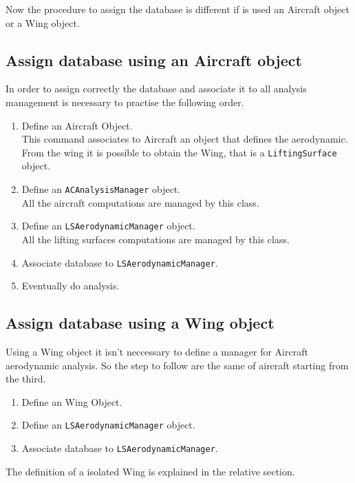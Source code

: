 Now the procedure to assign the database is different if is used an Aircraft object or a Wing object.

\subsection {Assign database using an Aircraft object}
In order to assign correctly the database and associate it to all analysis management is necessary to practise the following order.
\begin{enumerate}
\item Define an Aircraft Object.\\This command associates to Aircraft an object that defines the aerodynamic. From the wing it is possible to obtain the Wing, that is a \texttt{LiftingSurface} object.
\item Define an \texttt{ACAnalysisManager} object.\\All the aircraft computations are managed by this class.
\item Define an \texttt{LSAerodynamicManager} object.\\ All the lifting surfaces computations are managed by this class.
\item Associate database to \texttt{LSAerodynamicManager}.
\item Eventually do analysis.
\end{enumerate}

\subsection {Assign database using a Wing object}
Using a Wing object it isn't neccessary to define a manager for Aircraft aerodynamic analysis. So the step to follow are the same of aircraft starting from the third.
\begin{enumerate}
\item Define an Wing Object.
\item Define an \texttt{LSAerodynamicManager} object.
\item Associate database to \texttt{LSAerodynamicManager}.
\end{enumerate}

The definition of a isolated Wing is explained in the relative section.


